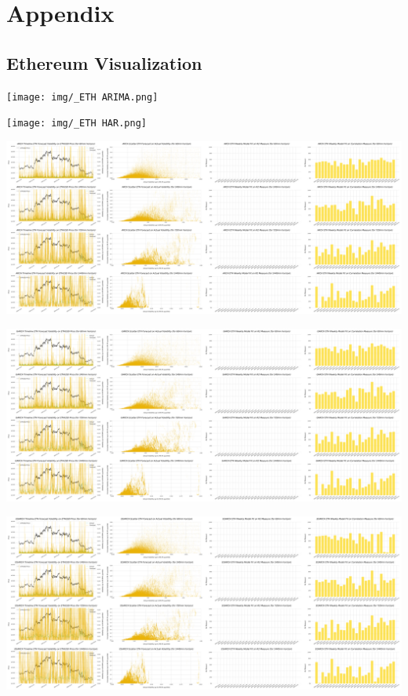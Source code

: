 \documentclass[9pt]{article}
\begin{document}
\newpage


\newpage

\section{Appendix}

\subsection{Ethereum Visualization}

\medskip
\centering
\texttt{[image: img/\_ETH ARIMA.png]}
\label{fig:_ETH_ARIMA}

\medskip
\centering
\texttt{[image: img/\_ETH HAR.png]}
\label{fig:_ETH_HAR}

\medskip
\centering
\includegraphics[width=.90\columnwidth]{img/_ETH ARCH.png}
\label{fig:_ETH_ARCH}

\medskip
\centering
\includegraphics[width=.90\columnwidth]{img/_ETH GARCH.png}
\label{fig:_ETH_GARCH}

\medskip
\centering
\includegraphics[width=.90\columnwidth]{img/_ETH EGARCH.png}
\label{fig:_ETH_EGARCH}
\end{document}
